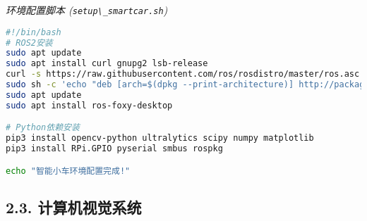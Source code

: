 \emph{环境配置脚本 (\passthrough{\lstinline!setup\_smartcar.sh!})}

\begin{lstlisting}[language=bash]
#!/bin/bash
# ROS2安装
sudo apt update
sudo apt install curl gnupg2 lsb-release
curl -s https://raw.githubusercontent.com/ros/rosdistro/master/ros.asc | sudo apt-key add -
sudo sh -c 'echo "deb [arch=$(dpkg --print-architecture)] http://packages.ros.org/ros2/ubuntu $(lsb_release -cs) main" > /etc/apt/sources.list.d/ros2-latest.list'
sudo apt update
sudo apt install ros-foxy-desktop

# Python依赖安装
pip3 install opencv-python ultralytics scipy numpy matplotlib
pip3 install RPi.GPIO pyserial smbus rospkg

echo "智能小车环境配置完成!"
\end{lstlisting}

\subsection{2.3.
计算机视觉系统}\label{ux8ba1ux7b97ux673aux89c6ux89c9ux7cfbux7edf}

